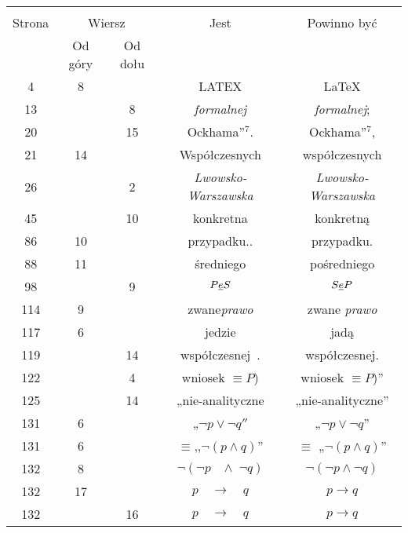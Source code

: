 \documentclass[a4paper,11pt]{article}
\begin{document}
\begin{center}
  \begin{tabular}{|c|c|c|c|c|}
    \hline
    & \multicolumn{2}{c|}{} & & \\
    Strona & \multicolumn{2}{c|}{Wiersz} & Jest
                              & Powinno być \\ \cline{2-3}
    & Od góry & Od dołu & & \\
    \hline
    4   &  8 & & LATEX & \LaTeX \\
    13  & &  8 & \emph{formalnej} & \emph{formalnej}; \\
    20  & & 15 & Ockhama''$^{ 7 }$. & Ockhama''$^{ 7 }$, \\
    21  & 14 & & Współczesnych & współczesnych \\
    26  & &  2 & \emph{Lwowsko-\! Warszawska} & \emph{Lwowsko-Warszawska} \\
    45  & & 10 & konkretna & konkretną \\
    86  & 10 & & przypadku.. & przypadku. \\
    88  & 11 & & średniego & pośredniego \\  %
    98  & &  9 & $P \underline{ e } S$ & $S \underline{ e } P$ \\
    114 &  9 & & zwane\emph{prawo} & zwane \emph{prawo} \\
    117 &  6 & & jedzie & jadą \\
    119 & & 14 & współczesnej~. & współczesnej. \\
    122 & &  4 & wniosek $\equiv P$) & wniosek $\equiv P$)'' \\
    125 & & 14 & „nie-analityczne & „nie-analityczne” \\
    131 &  6 & & „$\neg p \vee \neg q''$ & „$\neg p \vee \neg q$” \\
    131 &  6 & & $\equiv$,\hspace{2pt},$\neg ( p \land q )$”
           & $\equiv$ „$\neg ( p \land q )$” \\
    132 &  8 & & $\neg( \neg p\;\;\; \land\; \neg q ) $ & $\neg( \neg p \land \neg q ) $ \\
    132 & 17 & & $p\quad \to \quad q$ & $p \to q$ \\
    132 & & 16 & $p\quad \to \quad q$ & $p \to q$ \\
    \hline
  \end{tabular}
\end{center}
\end{document}
